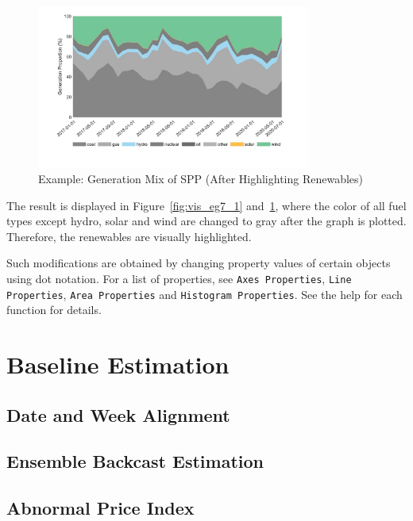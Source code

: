 \documentclass[11pt]{article}
\numberwithin{equation}{section}
\numberwithin{table}{section}
\numberwithin{figure}{section}
\begin{document}
\begin{figure}
  \centering
  \noindent\includegraphics[width=0.8\textwidth]{figures/visualization_example7_2.jpg}
  \caption{Example: Generation Mix of SPP (After Highlighting Renewables)} \label{fig:vis_eg7_2}
\end{figure}

The result is displayed in Figure~\ref{fig:vis_eg7_1} and~\ref{fig:vis_eg7_2}, where the color of all fuel types except hydro, solar and wind are changed to gray after the graph is plotted. Therefore, the renewables are visually highlighted.

Such modifications are obtained by changing property values of certain objects using dot notation. For a list of properties, see \verb!Axes Properties!, \verb!Line Properties!, \verb!Area Properties! and \verb!Histogram Properties!. See the help for each function for details.





\newpage
\section{Baseline Estimation} \label{sec:baseline}

\subsection{Date and Week Alignment}

\subsection{Ensemble Backcast Estimation}

\subsection{Abnormal Price Index}
\end{document}
